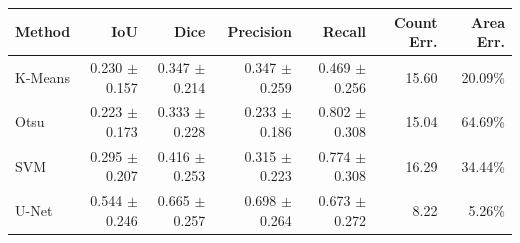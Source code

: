 \begin{tabular}{lrrrrrr}
\toprule
Method & IoU & Dice & Precision & Recall & Count Err. & Area Err. \\
\midrule
K-Means & 0.230 $\pm$ 0.157 & 0.347 $\pm$ 0.214 & 0.347 $\pm$ 0.259 & 0.469 $\pm$ 0.256 & 15.60 & 20.09\% \\
Otsu & 0.223 $\pm$ 0.173 & 0.333 $\pm$ 0.228 & 0.233 $\pm$ 0.186 & 0.802 $\pm$ 0.308 & 15.04 & 64.69\% \\
SVM & 0.295 $\pm$ 0.207 & 0.416 $\pm$ 0.253 & 0.315 $\pm$ 0.223 & 0.774 $\pm$ 0.308 & 16.29 & 34.44\% \\
U-Net & 0.544 $\pm$ 0.246 & 0.665 $\pm$ 0.257 & 0.698 $\pm$ 0.264 & 0.673 $\pm$ 0.272 & 8.22 & 5.26\% \\
\bottomrule
\end{tabular}
